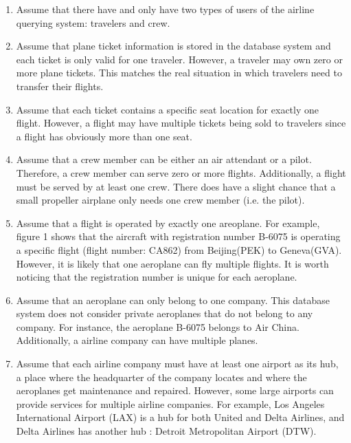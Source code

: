 \documentclass{article}
\begin{document}
	\begin{enumerate}
		\item Assume that there have and only have two types of users of the airline querying system: travelers and crew.
		
		\item Assume that plane ticket information is stored in the database system and each ticket is only valid for one traveler. However, a traveler may own zero or more plane tickets. This matches the real situation in which travelers need to transfer their flights. 
		
		\item Assume that each ticket contains a specific seat location for exactly one flight. However, a flight may have multiple tickets being sold to travelers since a flight has obviously more than one seat.   
		
		\item Assume that a crew member can be either an air attendant or a pilot. Therefore, a crew member can serve zero or more flights. Additionally, a flight must be served by at least one crew. There does have a slight chance that a small propeller airplane only needs one crew member (i.e. the pilot).
		
		\item Assume that a flight is operated by exactly one areoplane. For example, figure 1 shows that the aircraft with registration number B-6075 is operating a specific flight (flight number: CA862) from Beijing(PEK) to Geneva(GVA). However, it is likely that one aeroplane can fly multiple flights. It is worth noticing that the  registration number is unique for each aeroplane.
		
		\item Assume that an aeroplane can only belong to one company. This database system does not consider private aeroplanes that do not belong to any company. For instance, the aeroplane B-6075 belongs to Air China. Additionally, a airline company can have multiple planes. 
		
		\item Assume that each airline company must have at least one airport as its hub, a place where the headquarter of the company locates and where the aeroplanes get maintenance and repaired. However, some large airports can provide services for multiple airline companies. For example, Los Angeles International Airport (LAX) is a hub for both United and Delta Airlines, and Delta Airlines has another hub : Detroit Metropolitan Airport (DTW).
		

\end{enumerate}
\end{document}
